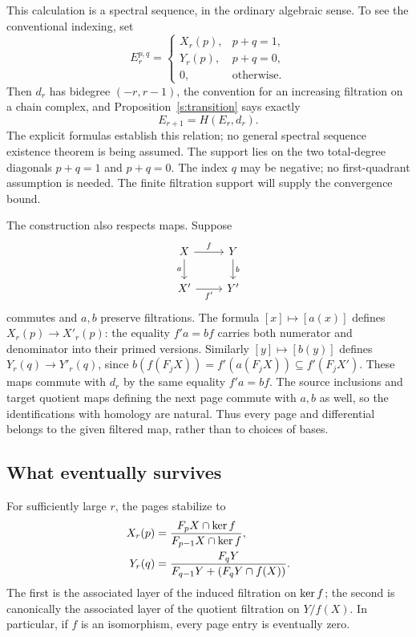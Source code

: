 This calculation is a spectral sequence, in the ordinary algebraic
sense. To see the conventional indexing, set
\[
E_r^{p,q}=
\begin{cases}
X_r(p),&p+q=1,\\
Y_r(p),&p+q=0,\\
0,&\text{otherwise}.
\end{cases}
\]
Then $d_r$ has bidegree $(-r,r-1)$, the convention for an increasing
filtration on a chain complex, and Proposition~\ref{s:transition} says
exactly
\[
E_{r+1}=H(E_r,d_r).
\]
The explicit formulas establish this relation; no general spectral
sequence existence theorem is being assumed.
The support lies on the two total-degree diagonals $p+q=1$ and $p+q=0$.
The index $q$ may be negative; no first-quadrant assumption is needed.
The finite filtration support will supply the convergence bound.

The construction also respects maps. Suppose
\[
\begin{tikzcd}
X\arrow[r,"f"]\arrow[d,"a"']&Y\arrow[d,"b"]\\
X'\arrow[r,"f'"']&Y'
\end{tikzcd}
\]
commutes and $a,b$ preserve filtrations. The formula $[x]\mapsto[a(x)]$
defines $X_r(p)\to X'_r(p)$: the equality $f'a=bf$ carries both numerator
and denominator into their primed versions. Similarly $[y]\mapsto[b(y)]$
defines $Y_r(q)\to Y'_r(q)$, since
$b(f(F_jX))=f'(a(F_jX))\subseteq f'(F_jX')$. These maps commute with
$d_r$ by the same equality $f'a=bf$. The source inclusions and target
quotient maps defining the next page commute with $a,b$ as well, so
the identifications with homology are natural. Thus every page and differential
belongs to the given filtered map, rather than to choices of bases.

\subsection{What eventually survives}

\begin{proposition}\label{s:convergence}
For sufficiently large $r$, the pages stabilize to
\begin{align*}
X_r(p)&=
\frac{F_pX\cap\operatorname{ker} f}{F_{p-1}X\cap\operatorname{ker} f},\\
Y_r(q)&=
\frac{F_qY}{F_{q-1}Y+(F_qY\cap f(X))}.
\end{align*}
The first is the associated layer of the induced filtration on $\operatorname{ker} f$;
the second is canonically the associated layer of the quotient filtration
on $Y/f(X)$. In particular, if $f$ is an isomorphism, every page entry
is eventually zero.
\end{proposition}

